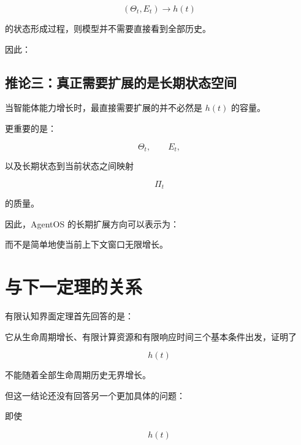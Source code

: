 \[
(\Theta_t,E_t)
\rightarrow
h(t)
\]

的状态形成过程，则模型并不需要直接看到全部历史。

因此：

\begin{statementbox}
\centering
{}
\end{statementbox}


\subsection{推论三：真正需要扩展的是长期状态空间}

当智能体能力增长时，最直接需要扩展的并不必然是 $h(t)$ 的容量。

更重要的是：

\[
\Theta_t,
\qquad
E_t,
\]

以及长期状态到当前状态之间映射

\[
\Pi_t
\]

的质量。

因此，AgentOS 的长期扩展方向可以表示为：

\begin{statementbox}
\centering
{}
\end{statementbox}

而不是简单地使当前上下文窗口无限增长。


\section{与下一定理的关系}

有限认知界面定理首先回答的是：

\begin{statementbox}
\centering
{}
\end{statementbox}

它从生命周期增长、有限计算资源和有限响应时间三个基本条件出发，证明了

\[
h(t)
\]

不能随着全部生命周期历史无界增长。

但这一结论还没有回答另一个更加具体的问题：

即使

\[
h(t)
\]

